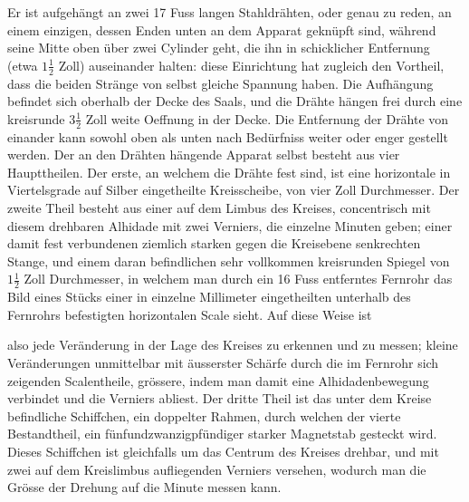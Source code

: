 Er ist aufgehängt an zwei 17 Fuss langen Stahldrähten, oder genau zu reden, an einem einzigen, dessen Enden unten an dem Apparat geknüpft sind, während seine Mitte oben über zwei Cylinder geht, die ihn in schicklicher Entfernung (etwa $1\frac{1}{2}$ Zoll) auseinander halten: diese Einrichtung hat zugleich den Vortheil, dass die beiden Stränge von selbst gleiche Spannung haben. Die Aufhängung befindet sich oberhalb der Decke des Saals, und die Drähte hängen frei durch eine kreisrunde $3\frac{1}{2}$ Zoll weite Oeffnung in der Decke. Die Entfernung der Drähte von einander kann sowohl oben als unten nach Bedürfniss weiter oder enger gestellt werden. Der an den Drähten hängende Apparat selbst besteht aus vier Haupttheilen. Der erste, an welchem die Drähte fest sind, ist eine horizontale in Viertelsgrade auf Silber eingetheilte Kreisscheibe, von vier Zoll Durchmesser. Der zweite Theil besteht aus einer auf dem Limbus des Kreises, concentrisch mit diesem drehbaren Alhidade mit zwei Verniers, die einzelne Minuten geben; einer damit fest verbundenen ziemlich starken gegen die Kreisebene senkrechten Stange, und einem daran befindlichen sehr vollkommen kreisrunden Spiegel von $1\frac{1}{2}$ Zoll Durchmesser, in welchem man durch ein 16 Fuss entferntes Fernrohr das Bild eines Stücks einer in einzelne Millimeter eingetheilten unterhalb des Fernrohrs befestigten horizontalen Scale sieht. Auf diese Weise ist
\par\clearpage
{}
\noindent also jede Veränderung in der Lage des Kreises zu erkennen und zu messen; kleine Veränderungen unmittelbar mit äusserster Schärfe durch die im Fernrohr sich zeigenden Scalentheile, grössere, indem man damit eine Alhidadenbewegung verbindet und die Verniers abliest. Der dritte Theil ist das unter dem Kreise befindliche Schiffchen, ein doppelter Rahmen, durch welchen der vierte Bestandtheil, ein fünfundzwanzigpfündiger starker Magnetstab gesteckt wird. Dieses Schiffchen ist gleichfalls um das Centrum des Kreises drehbar, und mit zwei auf dem Kreislimbus aufliegenden Verniers versehen, wodurch man die Grösse der Drehung auf die Minute messen kann.


